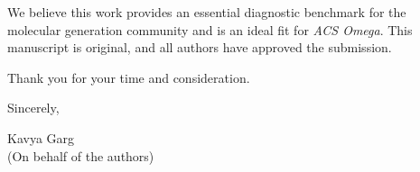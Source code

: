 \documentclass[11pt]{article}
\begin{document}
We believe this work provides an essential diagnostic benchmark for the molecular generation community and is an ideal fit for \textit{ACS Omega}. This manuscript is original, and all authors have approved the submission.

Thank you for your time and consideration.

\vspace{1.5em}

Sincerely,

\vspace{1em}

Kavya Garg \\
(On behalf of the authors)
\end{document}
